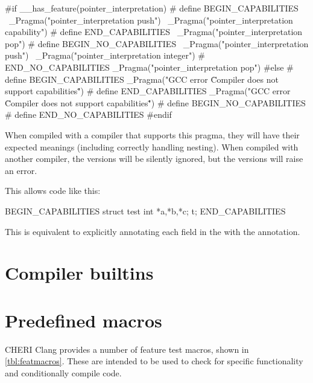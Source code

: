 \begin{csnippet}
#if __has_feature(pointer_interpretation)
#	define BEGIN_CAPABILITIES \
		_Pragma("pointer_interpretation push") \
		_Pragma("pointer_interpretation capability")
#	define END_CAPABILITIES \
		_Pragma("pointer_interpretation pop")
#	define BEGIN_NO_CAPABILITIES \
		_Pragma("pointer_interpretation push") \
		_Pragma("pointer_interpretation integer")
#	 END_NO_CAPABILITIES
		_Pragma("pointer_interpretation pop")
#else
#	define BEGIN_CAPABILITIES
		_Pragma("GCC error \"Compiler does not support capabilities\"")
#	define END_CAPABILITIES
		_Pragma("GCC error \"Compiler does not support capabilities\"")
#	define BEGIN_NO_CAPABILITIES
#	define END_NO_CAPABILITIES
#endif
\end{csnippet}

When compiled with a compiler that supports this pragma, they will have their expected meanings (including correctly handling nesting).
When compiled with another compiler, the  versions will be silently ignored, but the  versions will raise an error.

This allows code like this:

\begin{csnippet}
BEGIN_CAPABILITIES
struct test
{
	int *a,*b,*c;
} t;
END_CAPABILITIES
\end{csnippet}

This is equivalent to explicitly annotating each field in the  with the  annotation.


\section{Compiler builtins}
\section{Predefined macros}

CHERI Clang provides a number of feature test macros, shown in \autoref{tbl:featmacros}.
These are intended to be used to check for specific functionality and conditionally compile code.

